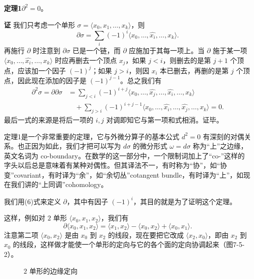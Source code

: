 \noindent\textbf{定理1}\quad $\partial^2=0$。

\noindent\textbf{证}\quad
我们只考虑一个单形 $\sigma=\langle x_0,x_1,\ldots,x_k\rangle$，则
\[
 \partial\sigma=\sum_i(-1)^i\langle x_0,\ldots,\widehat{x_i},\ldots,x_k\rangle.
\]
再施行 $\partial$ 时注意到 $\partial\sigma$ 已是一个链，而 $\partial$ 应施加于其每一项上。当 $\partial$ 施于某一项 $\langle x_0,\ldots,\widehat{x_i},\ldots,x_k\rangle$ 时应再删去一个顶点 $x_j$，如果 $j<i$，则删去的是第 $j+1$ 个顶点，应该加一个因子 $(-1)^j$；如果 $j>i$，则因 $x_i$ 本已删去，再删的是第 $j$ 个顶点，因此现在添加的因子是 $(-1)^{j-1}$。总之我们有
\begin{align*}
 \partial^2\sigma=\partial\partial\sigma
 &=\sum_{j<i}(-1)^{i+j}
 \langle x_0,\ldots,\widehat{x_j},\ldots,\widehat{x_i},\ldots,x_k\rangle\\
 &\quad+\sum_{j>i}(-1)^{i+j-1}
 \langle x_0,\ldots,\widehat{x_i},\ldots,\widehat{x_j},\ldots,x_k\rangle=0.
\end{align*}
最后一式的来源是将后一项的 $i,j$ 对调即知它与第一项和式相消。证毕。

定理1是一个非常重要的定理，它与外微分算子的基本公式 $d^2=0$ 有深刻的对偶关系。也正因为如此，我们才把可以写为 $d\sigma$ 的微分形式 $\omega=d\sigma$ 称为“上”之边缘，英文名词为 co-boundary。在数学的这一部分中，一个限制词加上了“co-”这样的字头以后总是意味着有某种对偶性。但其译法不一，有时称为“协”，如“协变”covariant，有时译为“余”，如“余切丛”cotangent bundle，有时译为“上”，如现在我们讲的“上同调”cohomology。

我们用(6)式来定义 $\partial$，其中有因子 $(-1)^i$，其目的就是为了证明这个定理。

这样，例如对 $2$ 单形 $\langle x_0,x_1,x_2\rangle$，我们有
\[
 \partial\langle x_0,x_1,x_2\rangle
 =\langle x_1,x_2\rangle-\langle x_0,x_2\rangle+\langle x_0,x_1\rangle.
\]
注意第二项 $\langle x_0,x_2\rangle$ 是由 $x_0$ 到 $x_2$ 的线段，现在要把它改成 $\langle x_2,x_0\rangle$，即由 $x_2$ 到 $x_0$ 的线段，这样做才能使一个单形的定向与它的各个面的定向协调起来（图7-5-2）。

\begin{figure}[htbp]
\centering
{}
\caption{$2$ 单形的边缘定向}
\end{figure}

